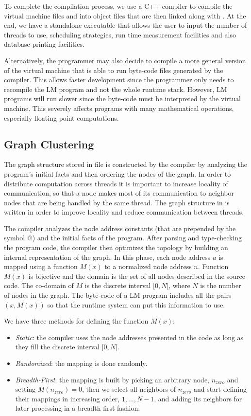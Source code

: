 To complete the compilation process, we use a C++ compiler to compile the
virtual machine files and  into object files that are then linked
along with . At the end, we have a standalone executable that
allows the user to input the number of threads to use, scheduling strategies,
run time measurement facilities and also database printing facilities.

Alternatively, the programmer may also decide to compile a more general version
of the virtual machine that is able to run byte-code files generated by the
compiler. This allows faster development since the programmer only needs to
recompile the LM program and not the whole runtime stack. However, LM programs
will run slower since the byte-code must be interpreted by the virtual machine.
This severely affects programs with many mathematical operations, especially
floating point computations.

\iffalse
\subsection{Graph Clustering}

The graph structure stored in file  is constructed by the
compiler by analyzing the program's initial facts and then ordering the nodes of
the graph.  In order to distribute computation across threads it is important to
increase locality of communication, so that a node makes most of its
communication to neighbor nodes that are being handled by the same thread. The
graph structure in  is written in order to improve locality and
reduce communication between threads.

The compiler analyzes the node address constants (that are prepended by the
symbol @) and the initial facts of the program. After parsing and type-checking the
program code, the compiler then optimizes the topology by building an internal
representation of the graph.  In this phase, each node address $a$ is mapped
using a function $M(x)$ to a normalized node address $n$. Function $M(x)$ is
bijective and the domain is the set of all nodes described in the source code.
The co-domain of $M$ is the discrete interval $[0, N[$, where $N$ is the number
of nodes in the graph. The byte-code of a LM program includes all the pairs $(x,
M(x))$ so that the runtime system can put this information to use.

We have three methods for defining the function $M(x)$:

\begin{itemize}
   \item \emph{Static}: the compiler uses the node addresses presented in the
      code as long as they fill the discrete interval $[0, N[$.
   \item \emph{Randomized}: the mapping is done randomly.
   \item \emph{Breadth-First}: the mapping is built by picking an arbitrary node, $n_{zero}$
   and setting $M(n_{zero}) = 0$, then we select all neighbors of $n_{zero}$ and start defining
   their mappings in increasing order, $1, \dotsc, N-1$, and adding its neighbors for later processing
   in a breadth first fashion.
\end{itemize}

